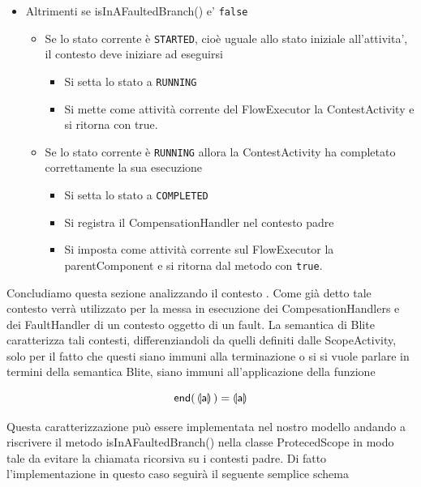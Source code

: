\begin{itemize}
  \item Altrimenti se isInAFaultedBranch() e' \texttt{false}
  	\begin{itemize}
  		\item Se lo stato corrente \`e \texttt{STARTED}, cioè uguale allo stato
  		iniziale all'attivita', il contesto deve iniziare ad eseguirsi
  			\begin{itemize} 
                \item Si setta lo stato a \texttt{RUNNING}
                \item Si mette come attività corrente del FlowExecutor la
                ContestActivity e si ritorna con true.
        	\end{itemize}   
  		\item Se lo stato corrente \`e \texttt{RUNNING} allora la ContestActivity
  		ha completato correttamente la sua esecuzione
  			\begin{itemize} 
                \item Si setta lo stato a \texttt{COMPLETED} 
                \item Si registra il CompensationHandler nel contesto padre
                \item Si imposta come attività corrente sul FlowExecutor la
                parentComponent e si ritorna dal metodo con \texttt{true}.
        	\end{itemize}  		 
	\end{itemize}
\end{itemize} 


Concludiamo questa sezione analizzando il contesto . Come
già detto tale contesto verrà utilizzato per la messa in esecuzione dei
CompesationHandlers e dei FaultHandler di un contesto oggetto di un fault.
La semantica di Blite caratterizza tali contesti, differenziandoli da quelli
definiti dalle ScopeActivity, solo per il fatto che questi siano immuni alla
terminazione o si si vuole parlare in termini della semantica Blite, siano immuni
all'applicazione della funzione  {}

\[
\sf{ end( \, \llparenthesis a \rrparenthesis \, ) = \llparenthesis a
\rrparenthesis }
\]
 
Questa caratterizzazione può essere implementata nel nostro modello andando a
riscrivere il metodo isInAFaultedBranch() nella classe ProtecedScope in modo
tale da evitare la chiamata ricorsiva su i contesti padre. Di fatto
l'implementazione in questo caso seguirà il seguente semplice schema

